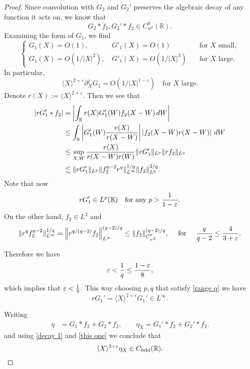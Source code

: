 \documentclass[11pt,reqno]{amsart}
\newcommand\bdd{{\mathrm{bdd}}}
\newcommand{\R}{\mathbb{R}}
\theoremstyle{plain}
\theoremstyle{remark}
\numberwithin{equation}{section}
\begin{document}
\begin{proof}
Since convolution with $G_2$ and $G_2'$ preserves the algebraic decay of any function it acts on, we know that 
\begin{equation}\label{decay 1}
   G_2 * f_2 ,
  G_2' * f_2 
  \in
  C_{w^2}^{0} (\mathbb R).
\end{equation}
Examining the form of $G_1$, we find
\begin{equation*}
\left\{\begin{array}{llll}
G_1(X) = O(1), \ \ & G'_1(X) = O(1)   \quad &  \text{for $X$ small}, \\
G_1(X) = O(1/|X|^2), \ & G'_1(X) = O(1/|X|^3) \quad &  \text{for $X$ large}.
\end{array}\right.
\end{equation*}
In particular,
\begin{equation*}
\langle X \rangle^{2+\varepsilon} \partial^j_X G_1 = O(1/|X|^{1-\varepsilon}) \quad \text{for } X \text{ large.} 
\end{equation*}
Denote $r(X) := \langle X \rangle^{2+\varepsilon}$. Then we see that
\begin{align*}
\left| r G_1' \ast f_2 \right| & = \left| \int_{\mathbb R} r(X) G_1'(W) f_2(X-W) \, dW \right| \\
& \le \int_{\mathbb R} \left| G_1'(W) {r(X) \over r(X-W)} \right| \left| f_2(X-W) r(X-W) \right| \, dW\\
  & \le \sup_{X,W} \frac{r(X)}{r(X-W) r(W)}  \| r G_1' \|_{L^p} \|r f_2\|_{L^q} \\
  &\lesssim \| r G_1' \|_{L^p} \|f_2^{q-2} r^{q}\|^{1/q}_{L^\infty} \|f_2\|_{L^2}^{2/q}.
\end{align*}
Note that now 
\[
r G_1' \in L^p(\mathbb R) \quad \text{for any } p > {1\over 1 - \varepsilon}.
\]
On the other hand, $f_2 \in L^2$ and 
\[
\|r^q f^{q-2}_2\|^{1/q}_{L^\infty} = \left\| r^{q/(q-2)} f_2 \right\|^{(q-2)/q}_{L^\infty} \le \|f_2\|^{(q-2)/q}_{C^0_{w^2}}, \quad \text{ for } \quad  {q \over q - 2} \le {4 \over 3 + \varepsilon}.
\]

Therefore we have
\begin{equation}\label{range q}
\varepsilon < {1\over q} \le {1- \varepsilon \over 8},
\end{equation}
which implies that $\varepsilon < {1\over 9}$. This way choosing $p, q$ that satisfy \eqref{range q} we have
\begin{equation}
  \label{this one}
  r G_1' = \langle X \rangle^{2+\varepsilon} G_1' \in L^\infty.
\end{equation}

Writing
\begin{align*}
  \eta &= G_1 * f_2 + G_2 * f_2, 
  \qquad 
  \eta_X = G_1' * f_2 + G_2' * f_2.
\end{align*}
and using \eqref{decay 1} and \eqref{this one} we conclude that
\begin{equation*}
\langle X \rangle^{2+\varepsilon} \eta_X \in C_{\bdd}(\R).\qedhere
\end{equation*}
\end{proof}
\end{document}
